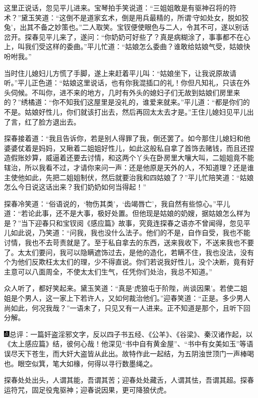 这里正说话，忽见平儿进来。宝琴拍手笑说道：“三姐姐敢是有驱神召将的符术？”黛玉笑道：“这倒不是道家玄术，倒是用兵最精的，所谓‘守如处女，脱如狡兔’，出其不备之妙策也。”二人取笑。宝钗便使眼色与二人，令其不可，遂以别话岔开。探春见平儿来了，遂问：“你奶奶可好些了？真是病糊涂了，事事都不在心上，叫我们受这样的委曲。”平儿忙道：“姑娘怎么委曲？谁敢给姑娘气受，姑娘快吩咐我。”

当时住儿媳妇儿方慌了手脚，遂上来赶着平儿叫：“姑娘坐下，让我说原故请听。”平儿正色道：“姑娘这里说话，也有你我混插口的礼！你但凡知礼，只该在外头伺候。不叫你，进不来的地方，几时有外头的媳妇子们无故到姑娘们房里来的？”绣橘道：“你不知我们这屋里是没礼的，谁爱来就来。”平儿道：“都是你们的不是。姑娘好性儿，你们就该打出去，然后再回太太去才是。”王住儿媳妇见平儿出了言，红了脸方退出去。

探春接着道：“我且告诉你，若是别人得罪了我，倒还罢了。如今那住儿媳妇和他婆婆仗着是妈妈，又瞅着二姐姐好性儿，如此这般私自拿了首饰去赌钱，而且还捏造假账妙算，威逼着还要去讨情，和这两个丫头在卧房里大嚷大叫，二姐姐竟不能辖治，所以我看不过，才请你来问一声：还是他原是天外的人，不知道理？还是谁主使他如此，先把二姐姐制伏，然后就要治我和四姑娘了？”平儿忙陪笑道：“姑娘怎么今日说这话出来？我们奶奶如何当得起！”

探春冷笑道：“俗语说的，‘物伤其类’，‘齿竭唇亡’，我自然有些惊心。”平儿道：“若论此事，还不是大事，极好处置。但他现是姑娘的奶嫂，据姑娘怎么样为是？”当下迎春只和宝钗阅《感应篇》故事，究竟连探春之语亦不曾闻得，忽见平儿如此说，乃笑道：“问我，我也没什么法子。他们的不是，自作自受，我也不能讨情，我也不去苛责就是了。至于私自拿去的东西，送来我收下，不送来我也不要了。太太们要问，我可以隐瞒遮饰过去，是他的造化，若瞒不住，我也没法，没有个为他们反欺枉太太们的理，少不得直说。你们若说我好性儿，没个决断，竟有好主意可以八面周全，不使太太们生气，任凭你们处治，我总不知道。”

众人听了，都好笑起来。黛玉笑道：“真是‘虎狼屯于阶陛，尚谈因果’。若使二姐姐是个男人，这一家上下若许人，又如何裁治他们。”迎春笑道：“正是。多少男人尚如此，何况我哉？”一语未了，只见又有一人进来。正不知道是那个，且听下回分解。

{\includegraphics[width=3mm]{../Images/00005}\kaishu 总评：一篇奸盗淫邪文字，反以四子书五经、《公羊》、《谷梁》、秦汉诸作起，以《太上感应篇》结，彼何心哉！他深见“书中自有黄金屋”、“书中有女美如玉”等语误尽天下苍生，而大奸大盗皆从此出。故特作此一起结，为五阴浊世顶门一声棒喝也。眼空似箕，笔大如椽，何得以寻行数墨绳之。}

{\kaishu 探春处处出头，人谓其能，吾谓其苦；迎春处处藏舌，人谓其怯，吾谓其超。探春运符咒，固足役鬼驱神；迎春说因果，更可降狼伏虎。}
